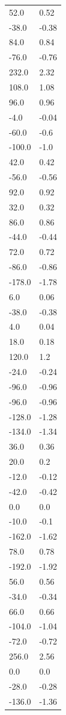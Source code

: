 \begin{longtable}{ll}
52.0 & 0.52 \\
-38.0 & -0.38 \\
84.0 & 0.84 \\
-76.0 & -0.76 \\
232.0 & 2.32 \\
108.0 & 1.08 \\
96.0 & 0.96 \\
-4.0 & -0.04 \\
-60.0 & -0.6 \\
-100.0 & -1.0 \\
42.0 & 0.42 \\
-56.0 & -0.56 \\
92.0 & 0.92 \\
32.0 & 0.32 \\
86.0 & 0.86 \\
-44.0 & -0.44 \\
72.0 & 0.72 \\
-86.0 & -0.86 \\
-178.0 & -1.78 \\
6.0 & 0.06 \\
-38.0 & -0.38 \\
4.0 & 0.04 \\
18.0 & 0.18 \\
120.0 & 1.2 \\
-24.0 & -0.24 \\
-96.0 & -0.96 \\
-96.0 & -0.96 \\
-128.0 & -1.28 \\
-134.0 & -1.34 \\
36.0 & 0.36 \\
20.0 & 0.2 \\
-12.0 & -0.12 \\
-42.0 & -0.42 \\
0.0 & 0.0 \\
-10.0 & -0.1 \\
-162.0 & -1.62 \\
78.0 & 0.78 \\
-192.0 & -1.92 \\
56.0 & 0.56 \\
-34.0 & -0.34 \\
66.0 & 0.66 \\
-104.0 & -1.04 \\
-72.0 & -0.72 \\
256.0 & 2.56 \\
0.0 & 0.0 \\
-28.0 & -0.28 \\
-136.0 & -1.36 \\

\end{longtable}

